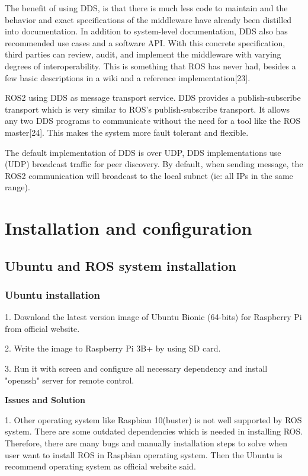 \documentclass{mproj}
\begin{document}
The benefit of using DDS, is that there is much less code to maintain and the behavior and exact specifications of the middleware have already been distilled into documentation. In addition to system-level documentation, DDS also has recommended use cases and a software API. With this concrete specification, third parties can review, audit, and implement the middleware with varying degrees of interoperability. This is something that ROS has never had, besides a few basic descriptions in a wiki and a reference implementation[23].

ROS2 using DDS as message transport service. DDS provides a publish-subscribe transport which is very similar to ROS’s publish-subscribe transport. It allows any two DDS programs to communicate without the need for a tool like the ROS master[24]. This makes the system more fault tolerant and flexible.

The default implementation of DDS is over UDP,  DDS implementations use (UDP) broadcast traffic for peer discovery. By default, when sending message, the ROS2 communication will broadcast to the local subnet (ie: all IPs in the same range).

\chapter{Installation and configuration}

\section{Ubuntu and ROS system installation}

\subsection{Ubuntu installation}
1. Download the latest version image of Ubuntu Bionic (64-bits) for Raspberry Pi from official website.

2. Write the image to Raspberry Pi 3B+ by using SD card.

3. Run it with screen and configure all necessary dependency and install "openssh" server for remote control.
 
\textbf{Issues and Solution} 

1. Other operating system like Raspbian 10(buster) is not well supported by ROS system. There are some outdated dependencies which is needed in installing ROS. Therefore, there are many bugs and manually installation steps to solve when user want to install ROS in Raspbian operating system. Then the Ubuntu is recommend operating system as official website said.
\end{document}
